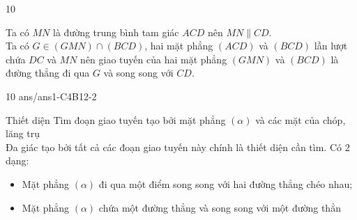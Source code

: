 \begin{indapan}{10}
\begin{ex}
{        \immini
        {
            Ta có $MN$ là đường trung bình tam giác $ACD$ nên $ MN\parallel  CD$.\\
            Ta có $G\in\left(GMN\right)\cap\left(BCD\right)$,  hai mặt phẳng $\left(ACD\right)$ và $\left(BCD\right)$ lần lượt chứa $ DC$ và $MN$ nên giao tuyến của hai mặt phẳng $\left(GMN\right)$ và $\left(BCD\right)$ là đường thẳng đi qua $G$ và song song với $CD$.
        }
        {
        }

    }
\end{ex}

\begin{indapan}{10}
    {ans/ans1-C4B12-2}
\end{indapan}
\begin{dang}{Thiết diện}
    Tìm đoạn giao tuyến tạo bởi mặt phẳng $\left(\alpha\right)$ và các mặt của chóp, lăng trụ\\
    Đa giác tạo bởi tất cả các đoạn giao tuyến này chính là thiết diện cần tìm. Có $2$ dạng:
    \begin{itemize}
        \item Mặt phẳng $\left(\alpha\right)$ đi qua một điểm song song với hai đường thẳng chéo nhau;
        \item Mặt phẳng $\left(\alpha\right)$ chứa một đường thẳng và song song với một đường thẳn
    \end{itemize}
\end{dang}

\end{indapan}
